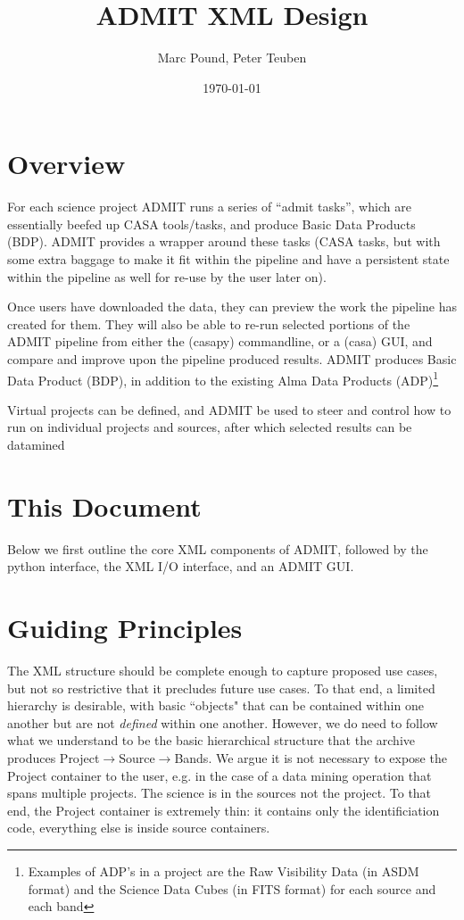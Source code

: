 \documentclass{report}
\title{ADMIT XML Design}
\author{Marc Pound, Peter Teuben}
\date{\today}
\begin{document}
\maketitle

\section{Overview}

For each science project ADMIT runs a series of ``admit tasks'', which
are essentially beefed up CASA tools/tasks, and produce Basic Data
Products (BDP).  ADMIT provides a wrapper around these tasks
(CASA tasks, but with some extra baggage to make it fit within the pipeline
and have a persistent state within the pipeline as well for re-use by
the user later on).

Once users have downloaded the data, they can preview the work the pipeline
has created for them. They will also be able to re-run
selected portions of the ADMIT pipeline from either the (casapy)
commandline, or a (casa) GUI, and compare and improve upon the
pipeline produced results. ADMIT produces Basic Data Product (BDP), in
addition to the existing Alma Data Products (ADP)\footnote{Examples of
ADP's in a project are the Raw Visibility Data (in ASDM format) and
the Science Data Cubes (in FITS format) for each source and each
band}

Virtual projects can be defined, and ADMIT be used to steer and control
how to run on individual projects and sources, after which selected
results can be datamined 

\section{This Document}

Below we first outline the core XML components of ADMIT, followed by
the python interface, the XML I/O interface, and an ADMIT GUI.

\section{Guiding Principles}
The XML structure should be complete enough to capture proposed use cases,
but not so restrictive that it precludes future use cases. To that end, a
limited hierarchy is desirable, with basic ``objects" that can be contained
within one another but are not {\it defined} within one another.  However, we
do need to follow what we understand to be the basic hierarchical structure
that the archive produces Project$\rightarrow$Source$\rightarrow$Bands.
We argue it is not necessary to expose the Project container to
the user, e.g. in the case of a data mining operation that spans multiple
projects. The science is in the sources not the project. To that end, the
Project container is extremely thin: it contains only the identificiation
code, everything else is inside source containers.
\end{document}
